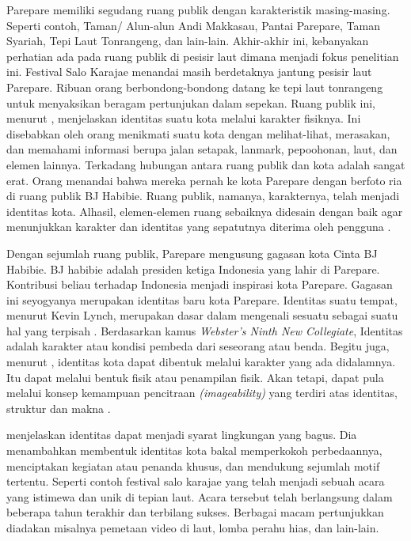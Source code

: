\documentclass[12pt]{simart} %
\begin{document}

Parepare memiliki segudang ruang publik dengan karakteristik masing-masing. Seperti contoh, Taman/ Alun-alun Andi Makkasau, Pantai Parepare, Taman Syariah, Tepi Laut Tonrangeng, dan lain-lain.
Akhir-akhir ini, kebanyakan perhatian ada pada ruang publik di pesisir laut dimana menjadi fokus penelitian ini.
Festival Salo Karajae menandai masih berdetaknya jantung pesisir laut Parepare. Ribuan orang berbondong-bondong datang ke tepi laut tonrangeng untuk menyaksikan beragam pertunjukan dalam sepekan.
Ruang publik ini, menurut \cite{hartanti2014},   menjelaskan identitas suatu kota melalui karakter fisiknya.
Ini disebabkan oleh orang menikmati suatu kota dengan melihat-lihat, merasakan, dan memahami informasi berupa jalan setapak, lanmark, pepoohonan, laut, dan elemen lainnya.
Terkadang hubungan antara ruang publik dan kota adalah sangat erat. Orang menandai bahwa mereka pernah ke kota Parepare dengan berfoto ria di ruang publik BJ Habibie. Ruang publik, namanya, karakternya, telah menjadi identitas kota. Alhasil, elemen-elemen ruang sebaiknya didesain dengan baik agar menunjukkan karakter dan identitas yang sepatutnya diterima oleh pengguna \citep{hartanti2014}.

Dengan sejumlah ruang publik, Parepare mengusung gagasan kota Cinta BJ Habibie. BJ habibie adalah presiden ketiga Indonesia yang lahir di Parepare.
Kontribusi beliau terhadap Indonesia menjadi inspirasi kota Parepare. Gagasan ini seyogyanya merupakan identitas baru kota Parepare.
Identitas suatu tempat, menurut Kevin Lynch, merupakan dasar dalam mengenali sesuatu sebagai suatu hal yang terpisah \citep{hartanti2014}. Berdasarkan kamus \textit{Webster's Ninth New Collegiate}, Identitas adalah karakter atau kondisi pembeda dari seseorang atau benda.
Begitu juga, menurut \cite{hartanti2014}, identitas kota dapat dibentuk melalui karakter yang ada didalamnya. Itu dapat melalui bentuk fisik atau penampilan fisik. Akan tetapi, dapat pula melalui konsep kemampuan pencitraan \textit{(imageability)} yang terdiri atas identitas, struktur dan makna \citep{lynch1984}.

\cite{hartanti2014} menjelaskan identitas dapat menjadi syarat lingkungan yang bagus. Dia menambahkan membentuk identitas kota bakal memperkokoh perbedaannya, menciptakan kegiatan atau penanda khusus, dan mendukung sejumlah motif tertentu. Seperti contoh festival salo karajae yang telah menjadi sebuah acara yang istimewa dan unik di tepian laut. Acara tersebut telah berlangsung dalam beberapa tahun terakhir dan terbilang sukses. Berbagai macam pertunjukkan diadakan misalnya pemetaan video di laut, lomba perahu hias, dan lain-lain.
\end{document}

